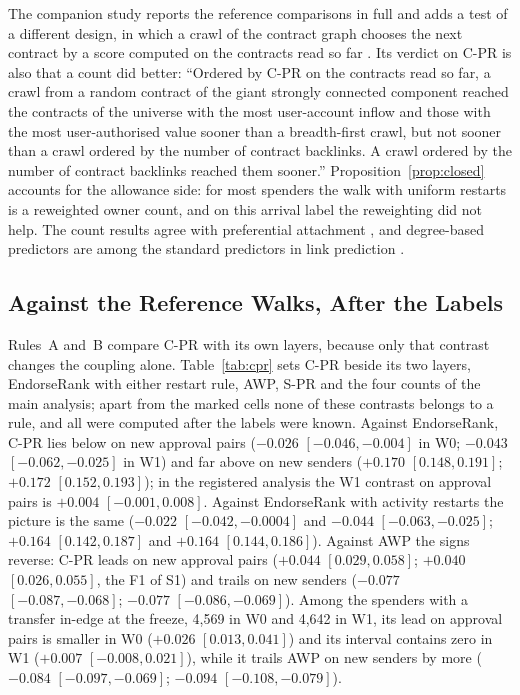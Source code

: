 \documentclass{ieeeaccess}
\newcommand{\cpr}{\mbox{C-PR}}
\newcommand{\spr}{\mbox{S-PR}}
\begin{document}
The companion study reports the reference comparisons in full and adds a test of a different design, in which a crawl of the contract graph chooses the next contract by a score computed on the contracts read so far \cite{kwon2026companion}. Its verdict on \cpr{} is also that a count did better: ``Ordered by C-PR on the contracts read so far, a crawl from a random contract of the giant strongly connected component reached the contracts of the universe with the most user-account inflow and those with the most user-authorised value sooner than a breadth-first crawl, but not sooner than a crawl ordered by the number of contract backlinks. A crawl ordered by the number of contract backlinks reached them sooner.'' Proposition~\ref{prop:closed} accounts for the allowance side: for most spenders the walk with uniform restarts is a reweighted owner count, and on this arrival label the reweighting did not help. The count results agree with preferential attachment \cite{barabasi1999scaling,newman2001clustering}, and degree-based predictors are among the standard predictors in link prediction \cite{libennowell2007link}.



\subsection{Against the Reference Walks, After the Labels}
\label{sec:reference}
Rules~A and~B compare \cpr{} with its own layers, because only that contrast changes the coupling alone. Table~\ref{tab:cpr} sets \cpr{} beside its two layers, EndorseRank with either restart rule, AWP, \spr{} and the four counts of the main analysis; apart from the marked cells none of these contrasts belongs to a rule, and all were computed after the labels were known. Against EndorseRank, \cpr{} lies below on new approval pairs ($-0.026$ $[-0.046,-0.004]$ in W0; $-0.043$ $[-0.062,-0.025]$ in W1) and far above on new senders ($+0.170$ $[0.148,0.191]$; $+0.172$ $[0.152,0.193]$); in the registered analysis the W1 contrast on approval pairs is $+0.004$ $[-0.001,0.008]$. Against EndorseRank with activity restarts the picture is the same ($-0.022$ $[-0.042,-0.0004]$ and $-0.044$ $[-0.063,-0.025]$; $+0.164$ $[0.142,0.187]$ and $+0.164$ $[0.144,0.186]$). Against AWP the signs reverse: \cpr{} leads on new approval pairs ($+0.044$ $[0.029,0.058]$; $+0.040$ $[0.026,0.055]$, the F1 of S1) and trails on new senders ($-0.077$ $[-0.087,-0.068]$; $-0.077$ $[-0.086,-0.069]$). Among the spenders with a transfer in-edge at the freeze, 4,569 in W0 and 4,642 in W1, its lead on approval pairs is smaller in W0 ($+0.026$ $[0.013,0.041]$) and its interval contains zero in W1 ($+0.007$ $[-0.008,0.021]$), while it trails AWP on new senders by more ($-0.084$ $[-0.097,-0.069]$; $-0.094$ $[-0.108,-0.079]$).
\end{document}

